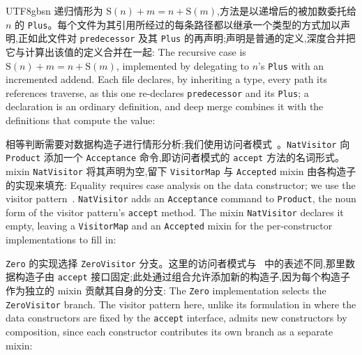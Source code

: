 \begin{CJK*}{UTF8}{gbsn}
\ifPaperChinese
  递归情形为 $\mathrm{S}(n) + m = n + \mathrm{S}(m)$,方法是以递增后的被加数委托给 $n$ 的 \texttt{Plus}。每个文件为其引用所经过的每条路径都以继承一个类型的方式加以声明,正如此文件对 \texttt{predecessor} 及其 \texttt{Plus} 的再声明;声明是普通的定义,深度合并把它与计算出该值的定义合并在一起:
  \else
  The recursive case is $\mathrm{S}(n) + m = n + \mathrm{S}(m)$,
  implemented by delegating to $n$'s \texttt{Plus} with an incremented addend.
  Each file declares, by inheriting a type, every path its references
  traverse, as this one re-declares \texttt{predecessor} and its
  \texttt{Plus}; a declaration is an ordinary definition, and deep
  merge combines it with the definitions that compute the value:
  \fi
{}

\ifPaperChinese
相等判断需要对数据构造子进行情形分析;我们使用访问者模式~\cite{gamma1994-design-patterns}。\texttt{NatVisitor} 向 \texttt{Product} 添加一个 \texttt{Acceptance} 命令,即访问者模式的 \texttt{accept} 方法的名词形式。mixin \texttt{NatVisitor} 将其声明为空,留下 \texttt{VisitorMap} 与 \texttt{Accepted} mixin 由各构造子的实现来填充:
\else
Equality requires case analysis on the data constructor; we use the
visitor pattern~\cite{gamma1994-design-patterns}.
\texttt{NatVisitor} adds an \texttt{Acceptance} command to \texttt{Product},
the noun form of the visitor pattern's \texttt{accept} method.
The mixin \texttt{NatVisitor} declares it empty, leaving a \texttt{VisitorMap} and an
\texttt{Accepted} mixin for the per-constructor implementations to fill in:
\fi
{}

\ifPaperChinese
  \texttt{Zero} 的实现选择 \texttt{ZeroVisitor} 分支。这里的访问者模式与~\cite{gamma1994-design-patterns} 中的表述不同,那里数据构造子由 \texttt{accept} 接口固定;此处通过组合允许添加新的构造子,因为每个构造子作为独立的 mixin 贡献其自身的分支:
  \else
  The \texttt{Zero} implementation selects the \texttt{ZeroVisitor} branch.
  The visitor pattern here, unlike its formulation in
  \cite{gamma1994-design-patterns} where the data constructors are fixed by the
  \texttt{accept} interface, admits new constructors by composition, since each
  constructor contributes its own branch as a separate mixin:
  \fi
{}


\end{CJK*}
